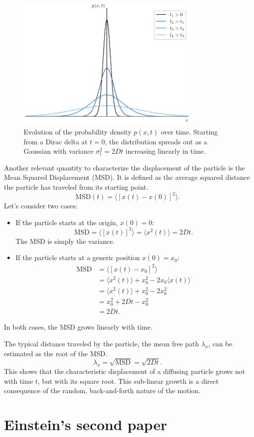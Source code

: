 \begin{figure}[h!]
    \centering
    \includegraphics[width=0.8\textwidth]{images/gaussian_evolution.pdf}
    \caption{Evolution of the probability density $p(x,t)$ over time. Starting from a Dirac delta at $t=0$, the distribution spreads out as a Gaussian with variance $\sigma_t^2=2Dt$ increasing linearly in time.}
    \label{fig:gaussian_evolution}
\end{figure}


Another relevant quantity to characterize the displacement of the particle is the Mean Squared Displacement (MSD). It is defined as the average squared distance the particle has traveled from its starting point.
\[
\text{MSD}(t) = \langle [x(t) - x(0)]^2 \rangle.
\]
Let's consider two cases:
\begin{itemize}
    \item If the particle starts at the origin, $x(0)=0$:
    \[
    \text{MSD} = \langle [x(t)]^2 \rangle = \langle x^2(t) \rangle = 2Dt.
    \]
    The MSD is simply the variance.

    \item If the particle starts at a generic position $x(0)=x_0$: 
    \begin{align*}
        \text{MSD} &= \langle [x(t) - x_0]^2 \rangle \\
        &= \langle x^2(t)\rangle + x_0^2 - 2x_0  \langle x(t)\rangle\\
        &= \langle x^2(t)\rangle + x_0^2 - 2x_0^2  \\
        & = x_0^2  + 2Dt - x_0^2 \\
        & = 2Dt.
    \end{align*}
\end{itemize}
In both cases, the MSD grows linearly with time. 

The typical distance traveled by the particle, the mean free path  $\lambda_x$, can be estimated as the root of the MSD.
\[
\lambda_x = \sqrt{\text{MSD}} = \sqrt{2Dt}.
\]
This shows that the characteristic displacement of a diffusing particle grows not with time $t$, but with its square root. This sub-linear growth is a direct consequence of the random, back-and-forth nature of the motion.

\section{Einstein's second paper}

